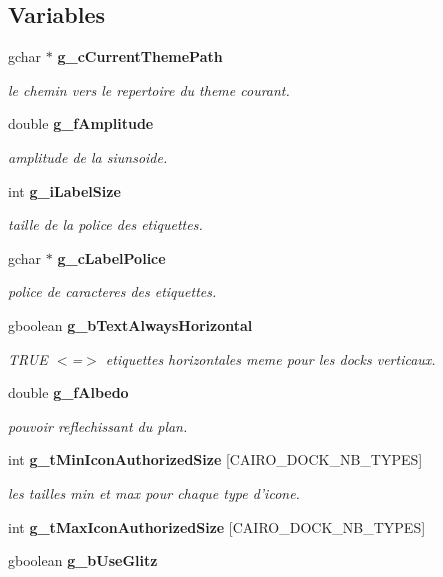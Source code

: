 \subsection*{Variables}
\begin{CompactItemize}
\item 
gchar $\ast$ {\bf g\_\-c\-Current\-Theme\-Path}
\begin{CompactList}\small\item\em le chemin vers le repertoire du theme courant. \item\end{CompactList}\item 
double {\bf g\_\-f\-Amplitude}
\begin{CompactList}\small\item\em amplitude de la siunsoide. \item\end{CompactList}\item 
int {\bf g\_\-i\-Label\-Size}
\begin{CompactList}\small\item\em taille de la police des etiquettes. \item\end{CompactList}\item 
gchar $\ast$ {\bf g\_\-c\-Label\-Police}
\begin{CompactList}\small\item\em police de caracteres des etiquettes. \item\end{CompactList}\item 
gboolean {\bf g\_\-b\-Text\-Always\-Horizontal}
\begin{CompactList}\small\item\em TRUE $<$=$>$ etiquettes horizontales meme pour les docks verticaux. \item\end{CompactList}\item 
double {\bf g\_\-f\-Albedo}
\begin{CompactList}\small\item\em pouvoir reflechissant du plan. \item\end{CompactList}\item 
int {\bf g\_\-t\-Min\-Icon\-Authorized\-Size} [CAIRO\_\-DOCK\_\-NB\_\-TYPES]
\begin{CompactList}\small\item\em les tailles min et max pour chaque type d'icone. \item\end{CompactList}\item 
int {\bf g\_\-t\-Max\-Icon\-Authorized\-Size} [CAIRO\_\-DOCK\_\-NB\_\-TYPES]
\item 
gboolean {\bf g\_\-b\-Use\-Glitz}
\end{CompactItemize}


